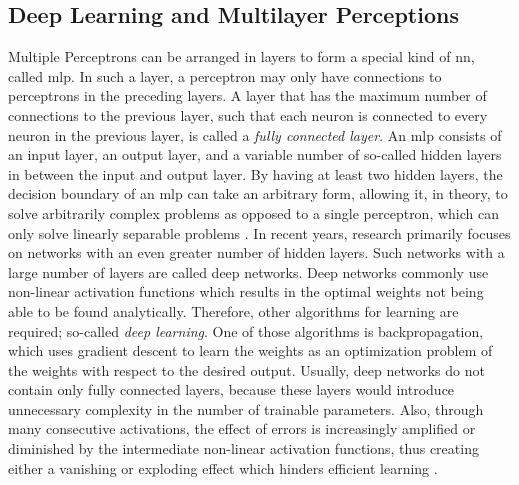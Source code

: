 \subsection{Deep Learning and Multilayer Perceptions}
Multiple Perceptrons can be arranged in layers to form a special kind of \ac{nn}, called \ac{mlp}. In such a layer, a perceptron may only have connections to perceptrons in the preceding layers. A layer that has the maximum number of connections to the previous layer, such that each neuron is connected to every neuron in the previous layer, is called a \emph{fully connected layer}. An \ac{mlp} consists of an input layer, an output layer, and a variable number of so-called hidden layers in between the input and output layer. By having at least two hidden layers, the decision boundary of an \ac{mlp} can take an arbitrary form, allowing it, in theory, to solve arbitrarily complex problems as opposed to a single perceptron, which can only solve linearly separable problems \cite{Lapedes1988}. In recent years, research primarily focuses on networks with an even greater number of hidden layers. Such networks with a large number of layers are called deep networks. Deep networks commonly use non-linear activation functions which results in the optimal weights not being able to be found analytically. Therefore, other algorithms for learning are required; so-called \emph{deep learning}. One of those algorithms is backpropagation, which uses gradient descent to learn the weights as an optimization problem of the weights with respect to the desired output. Usually, deep networks do not contain only fully connected layers, because these layers would introduce unnecessary complexity in the number of trainable parameters. Also, through many consecutive activations, the effect of errors is increasingly amplified or diminished by the intermediate non-linear activation functions, thus creating either a vanishing or exploding effect which hinders efficient learning \cite{Hanin2018}.

